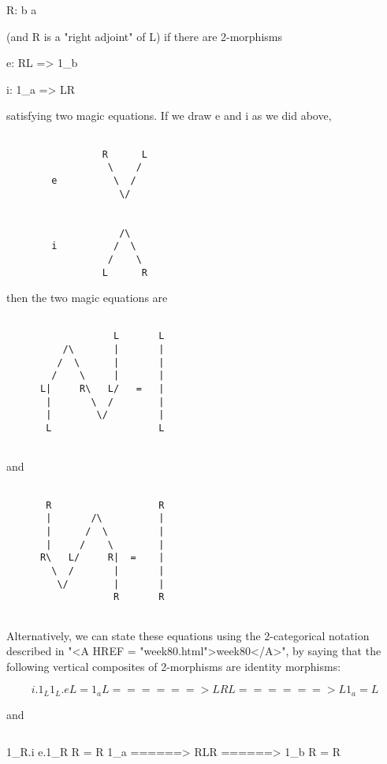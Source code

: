 R: b \to  a

(and R is a "right adjoint" of L) if there are 2-morphisms

e: RL => 1_{b}

i: 1_{a} => LR

satisfying two magic equations.  If we draw e and i as we did above, 


\begin{verbatim}

                 R      L
                  \    /
        e          \  / 
                    \/


                    /\
        i          /  \
                  /    \
                 L      R

\end{verbatim}
    
then the two magic equations are

                  

\begin{verbatim}

                   L       L
          /\       |       |
         /  \      |       |
        /    \     |       |
      L|     R\   L/   =   | 
       |       \  /        |
       |        \/         |
       L                   L


\end{verbatim}
    
and


\begin{verbatim}

       R                   R
       |       /\          |
       |      /  \         |
       |     /    \        |
      R\   L/     R|  =    | 
        \  /       |       |
         \/        |       |
                   R       R


\end{verbatim}
    
Alternatively, we can state these equations using the 2-categorical
notation described in "<A HREF = "week80.html">week80</A>", by saying that the following vertical
composites of 2-morphisms are identity morphisms:


$$

           i.1_{L}       1_{L}.e
L = 1_{a} L ======> LRL ======> L 1_{a} = L

$$
    
and

$$

           1_{R}.i       e.1_{R}
R = R 1_{a} ======> RLR ======> 1_{b} R = R

